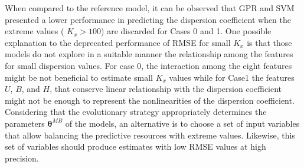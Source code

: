 \documentclass[a4paper,12pt, english]{article}
\newcommand{\xp}{\bm{\theta}}
\newcommand{\xmb}{\xp^{MB}}
\begin{document}
When compared to the reference model, it can be observed that  GPR and SVM  presented a lower performance in predicting the dispersion coefficient when the extreme values ( $K_x > 100$) are discarded for Cases 0 and 1.  One possible explanation to the deprecated performance of RMSE  for small $K_x$ is that those models do not explore in a suitable manner the relationship among the features for small dispersion values. For case 0, the interaction among the eight features might be not beneficial to estimate small $K_x$ values while for Case1 the features $U$, $B$, and $H$, that conserve linear relationship with the dispersion coefficient might not be enough to represent the nonlinearities of the dispersion coefficient. 
% 
Considering that the evolutionary strategy appropriately determines the parameters $ \xmb$ of the models, an alternative is to choose a set of input variables that allow balancing the predictive resources with extreme values. Likewise, this set of variables should produce estimates with low RMSE values at high precision.

\end{document}
